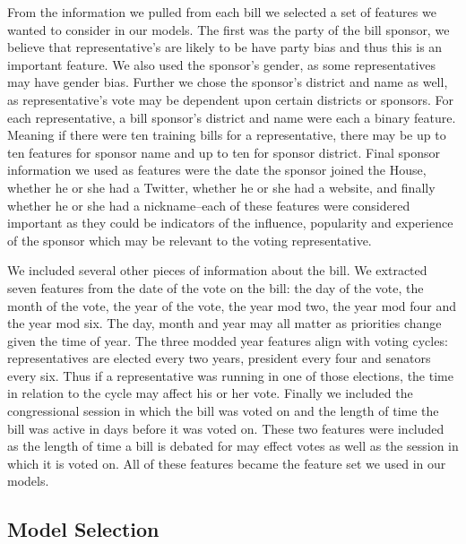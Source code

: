\documentclass[11pt,letterpaper,twocolumn]{article}
\begin{document}
	From the information we pulled from each bill we selected a set of features we wanted to consider in our models. The first was the party of the bill sponsor, we believe that representative's are likely to be have party bias and thus this is an important feature. We also used the sponsor's gender, as some representatives may have gender bias. Further we chose the sponsor's district and name as well, as representative's vote may be dependent upon certain districts or sponsors. For each representative, a bill sponsor's district and name were each a binary feature. Meaning if there were ten training bills for a representative, there may be up to ten features for sponsor name and up to ten for sponsor district. Final sponsor information we used as features were the date the sponsor joined the House, whether he or she had a Twitter, whether he or she had a website, and finally whether he or she had a nickname--each of these features were considered important as they could be indicators of the influence, popularity and experience of the sponsor which may be relevant to the voting representative.
	
	We included several other pieces of information about the bill. We extracted seven features from the date of the vote on the bill: the day of the vote, the month of the vote, the year of the vote, the year mod two, the year mod four and the year mod six. The day, month and year may all matter as priorities change given the time of year. The three modded year features align with voting cycles: representatives are elected every two years, president every four and senators every six. Thus if a representative was running in one of those elections, the time in relation to the cycle may affect his or her vote. Finally we included the congressional session in which the bill was voted on and the length of time the bill was active in days before it was voted on. These two features were included as the length of time a bill is debated for may effect votes as well as the session in which it is voted on. All of these features became the feature set we used in our models.

\subsection{Model Selection}
\end{document}
